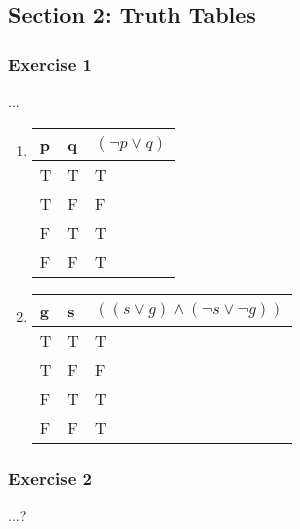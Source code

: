 \subsection{Section 2: Truth Tables}

\subsubsection{Exercise 1}
\question ...

\begin{solution}
    \begin{enumerate}
        \item {
            \begin{tabular}[t]{l l | l}
            p & q & $(\neg p \vee q)$ \\ \hline
            T & T & T \\
            T & F & F \\
            F & T & T \\
            F & F & T
            \end{tabular}
        }
        
        \item{
            \begin{tabular}[t]{l l | l}
            g & s & $((s \vee g) \wedge (\neg s \vee \neg g))$ \\ \hline
            T & T & T \\
            T & F & F \\
            F & T & T \\
            F & F & T
            \end{tabular}
        }
    \end{enumerate}
\end{solution}

\subsubsection{Exercise 2}
\question ...?

